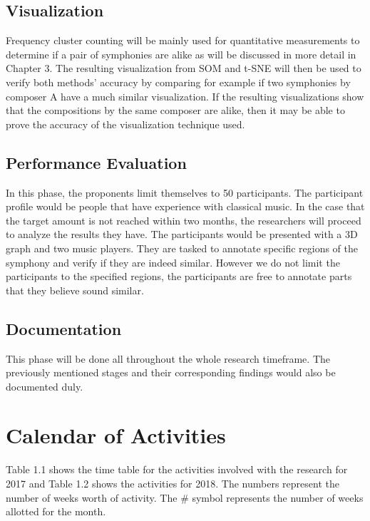\subsection{Visualization}
Frequency cluster counting will be mainly used for quantitative measurements to determine if a pair of symphonies are alike as will be discussed in more detail in Chapter 3. The resulting visualization from SOM and t-SNE will then be used to verify both methods’ accuracy by comparing for example if two symphonies by composer A have a much similar visualization. If the resulting visualizations show that the compositions by the same composer are alike, then it may be able to prove the accuracy of the visualization technique used.

\subsection{Performance Evaluation}
In this phase, the proponents limit themselves to 50 participants. The participant profile would be people that have experience with classical music. In the case that the target amount is not reached within two months, the researchers will proceed to analyze the results they have. The participants would be presented with a 3D graph and two music players. They are tasked to annotate specific regions of the symphony and verify if they are indeed similar. However we do not limit the participants to the specified regions, the participants are free to annotate parts that they believe sound similar.

\subsection{Documentation}
This phase will be done all throughout the whole research timeframe. The previously mentioned stages and their corresponding findings would also be documented duly.

\section{Calendar of Activities}
Table 1.1 shows the time table for the activities involved with the research for 2017 and Table 1.2 shows the activities for 2018. The numbers represent the number of weeks worth of activity. The \# symbol represents the number of weeks allotted for the month.

